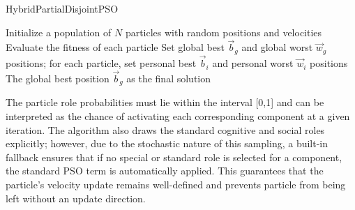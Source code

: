 {\vspace{.935em}
\begin{algorithm}[H]
\caption{HybridPartialDisjointPSO}\label{alg:hybridadditive}
Initialize a population of \(N\) particles with random positions and velocities\;  
Evaluate the fitness of each particle\;  
Set global best \(\vec{b}_g\) and global worst \(\vec{w}_g\) positions; for each particle, set personal best \(\vec{b}_i\) and personal worst \(\vec{w}_i\) positions\;  
\Return The global best position \(\vec{b}_g\) as the final solution \;
\end{algorithm}
\vspace{.935em}




The particle role probabilities must lie within the interval [0,1] and can be interpreted as the chance of activating each corresponding component at a given iteration. The algorithm also draws the standard cognitive and social roles explicitly; however, due to the stochastic nature of this sampling, a built-in fallback ensures that if no special or standard role is selected for a component, the standard PSO term is automatically applied. This guarantees that the particle’s velocity update remains well-defined and prevents particle from being left without an update direction.








}
